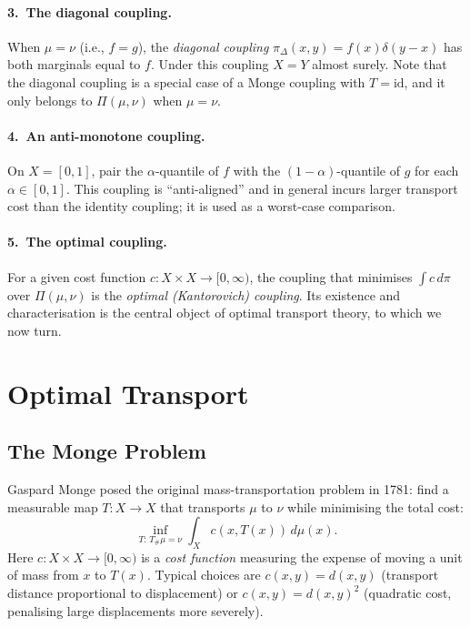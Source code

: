 \documentclass[12pt]{article}
\begin{document}
\paragraph{3.~The diagonal coupling.}
When $\mu = \nu$ (i.e., $f = g$), the \emph{diagonal
coupling} $\pi_\Delta(x,y) = f(x)\delta(y-x)$ has both
marginals equal to $f$.  Under this coupling $X = Y$ almost
surely.  Note that the diagonal coupling is a special case of
a Monge coupling with $T = \mathrm{id}$, and it only belongs
to $\Pi(\mu,\nu)$ when $\mu = \nu$.

\paragraph{4.~An anti-monotone coupling.}
On $X = [0,1]$, pair the $\alpha$-quantile of $f$ with the
$(1-\alpha)$-quantile of $g$ for each $\alpha \in [0,1]$.
This coupling is ``anti-aligned'' and in general incurs larger
transport cost than the identity coupling; it is used as a
worst-case comparison.

\paragraph{5.~The optimal coupling.}
For a given cost function $c: X \times X \to [0,\infty)$, the
coupling that minimises $\int c\,d\pi$ over $\Pi(\mu,\nu)$ is
the \emph{optimal (Kantorovich) coupling}.  Its existence and
characterisation is the central object of optimal transport
theory, to which we now turn.

\section{Optimal Transport}
\label{sec:ot}

\subsection{The Monge Problem}

Gaspard Monge posed the original mass-transportation problem
in 1781: find a measurable map $T: X \to X$ that transports
$\mu$ to $\nu$ while minimising the total cost:
\begin{equation}\label{eq:monge}
  \inf_{T:\, T_\#\mu = \nu}
  \int_X c(x, T(x))\,d\mu(x).
\end{equation}
Here $c: X \times X \to [0,\infty)$ is a \emph{cost function}
measuring the expense of moving a unit of mass from $x$ to
$T(x)$.  Typical choices are $c(x,y) = d(x,y)$ (transport
distance proportional to displacement) or $c(x,y) = d(x,y)^2$
(quadratic cost, penalising large displacements more severely).
\end{document}
